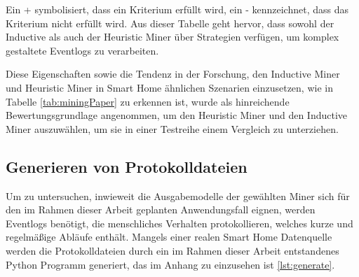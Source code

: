 \begin{table}[!h]
\centering
{}
\caption{Eigenschaften von Process Mining Verfahren zur Beurteilung ihrer Eignung für den Einsatz im Smart Home (Quelle: M.Munstermann, Technisch unterstützte Pflege von morgen, 2015, S.101 \cite{munster}}
\label{tab:my-table}
\end{table}
Ein + symbolisiert, dass ein Kriterium erfüllt wird, ein - kennzeichnet, dass das Kriterium nicht erfüllt wird. Aus dieser Tabelle geht hervor, dass sowohl der Inductive als auch der Heuristic Miner über Strategien verfügen, um komplex gestaltete Eventlogs zu verarbeiten. 

Diese Eigenschaften sowie die Tendenz in der Forschung, den Inductive Miner und Heuristic Miner in Smart Home ähnlichen Szenarien einzusetzen, wie in Tabelle \ref{tab:miningPaper} zu erkennen ist, wurde als hinreichende Bewertungsgrundlage angenommen, um den Heuristic Miner und den Inductive Miner auszuwählen, um sie in einer Testreihe einem Vergleich zu unterziehen. 

\subsection{Generieren von Protokolldateien}
Um zu untersuchen, inwieweit die Ausgabemodelle der gewählten Miner sich für den im Rahmen dieser Arbeit geplanten Anwendungsfall eignen, werden Eventlogs benötigt, die menschliches Verhalten protokollieren, welches kurze und regelmäßige Abläufe enthält. Mangels einer realen Smart Home Datenquelle werden die Protokolldateien durch ein im Rahmen dieser Arbeit entstandenes Python Programm generiert, das im Anhang zu einzusehen ist \ref{lst:generate}.


